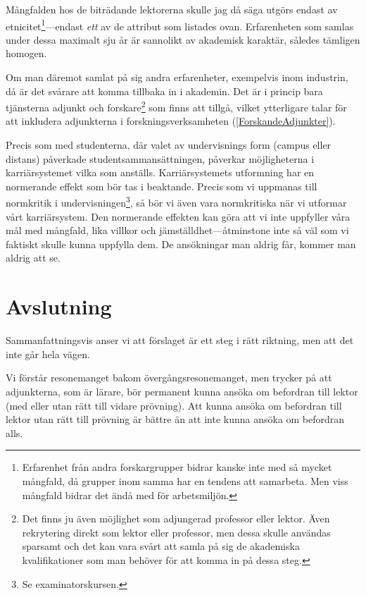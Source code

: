 \documentclass[a4paper,oneside,article,swedish]{memoir}
\let\section\chapter
\begin{document}
Mångfalden hos de biträdande lektorerna skulle jag då säga utgörs endast av 
etnicitet\footnote{%
  Erfarenhet från andra forskargrupper bidrar kanske inte med så mycket 
  mångfald, då grupper inom samma har en tendens att samarbeta.
  Men viss mångfald bidrar det ändå med för arbetsmiljön.
}---endast \emph{ett} av de attribut som listades ovan.
Erfarenheten som samlas under dessa maximalt sju år är sannolikt av akademisk 
karaktär, således tämligen homogen.

Om man däremot samlat på sig andra erfarenheter, exempelvis inom industrin, då 
är det svårare att komma tillbaka in i akademin.
Det är i princip bara tjänsterna adjunkt och forskare\footnote{%
  Det finns ju även möjlighet som adjungerad professor eller lektor.
  Även rekrytering direkt som lektor eller professor, men dessa skulle användas 
  sparsamt och det kan vara svårt att samla på sig de akademiska 
  kvalifikationer som man behöver för att komma in på dessa steg.
} som finns att tillgå, vilket ytterligare talar för att inkludera adjunkterna 
i forskningsverksamheten (\cref{ForskandeAdjunkter}).

Precis som med studenterna, där valet av undervisnings form (campus eller 
distans) påverkade studentsammansättningen, påverkar möjligheterna i 
karriärsystemet vilka som anställs.
Karriärsystemets utformning har en normerande effekt som bör tas i 
beaktande.
Precis som vi uppmanas till normkritik i undervisningen\footnote{%
  Se examinatorskursen.
}, så bör vi även vara normkritiska när vi utformar vårt karriärsystem.
Den normerande effekten kan göra att vi inte uppfyller våra mål med 
mångfald, lika villkor och jämställdhet---åtminstone inte så väl som vi 
faktiskt skulle kunna uppfylla dem.
De ansökningar man aldrig får, kommer man aldrig att se.


\section{Avslutning}

Sammanfattningsvis anser vi att förslaget är ett steg i rätt riktning, men att 
det inte går hela vägen.

Vi förstår resonemanget bakom övergångsresonemanget,
men trycker på att adjunkterna, som är lärare, bör permanent kunna ansöka om 
befordran till lektor (med eller utan rätt till vidare prövning).
Att kunna ansöka om befordran till lektor utan rätt till prövning är bättre än 
att inte kunna ansöka om befordran alls.

\printbibliography
\end{document}
